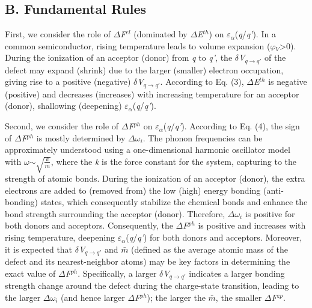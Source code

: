 \documentclass[onecolumn,preprint,superscriptaddress]{revtex4-1}
\begin{document}
\subsection*{B. Fundamental Rules}
First, we consider the role of $\Delta$\emph{F}$^{el}$ (dominated by $\Delta$\emph{E}$^{th}$) on $\varepsilon$$_{\alpha}$(\emph{q}/\emph{q'}). In a common semiconductor, rising temperature leads to volume expansion ($\varphi$$_{V}$>0). During the ionization of an acceptor (donor) from \emph{q} to \emph{q'}, the $\delta$\emph{V}$_{q\rightarrow q'}$ of the defect may expand (shrink) due to the larger (smaller) electron occupation, giving rise to a positive (negative) $\delta$\emph{V}$_{q\rightarrow q'}$. According to Eq. (3), $\Delta$\emph{E}$^{th}$ is negative (positive) and decreases (increases) with increasing temperature for an acceptor (donor), shallowing (deepening) $\varepsilon$$_{\alpha}$(\emph{q}/\emph{q'}).

Second, we consider the role of $\Delta$\emph{F}$^{ph}$ on $\varepsilon$$_{\alpha}$(\emph{q}/\emph{q'}). According to Eq. (4), the sign of $\Delta$\emph{F}$^{ph}$ is mostly determined by $\Delta$$\omega$$_{i}$. The phonon frequencies can be approximately understood using a one-dimensional harmonic oscillator model with $\omega$$\sim$$\sqrt{\frac{k}{m}}$, where the \emph{k} is the force constant for the system, capturing to the strength of atomic bonds. During the ionization of an acceptor (donor), the extra electrons are added to (removed from) the low (high) energy bonding (anti-bonding) states, which consequently stabilize the chemical bonds and enhance the bond strength surrounding the acceptor (donor). Therefore, $\Delta$$\omega$$_{i}$ is positive for both donors and acceptors. Consequently, the $\Delta$\emph{F}$^{ph}$ is positive and increases with rising temperature, deepening $\varepsilon$$_{\alpha}$(\emph{q}/\emph{q'}) for both donors and acceptors. Moreover, it is expected that $\delta$\emph{V}$_{q\rightarrow q'}$ and $\bar{m}$ (defined as the average atomic mass of the defect and its nearest-neighbor atoms) may be key factors in determining the exact value of $\Delta$\emph{F}$^{ph}$. Specifically, a larger $\delta$\emph{V}$_{q\rightarrow q'}$ indicates a larger bonding strength change around the defect during the charge-state transition, leading to the larger $\Delta$$\omega$$_{i}$ (and hence larger $\Delta$\emph{F}$^{ph}$); the larger the $\bar{m}$, the smaller $\Delta$\emph{F}$^{zp}$.
\end{document}
